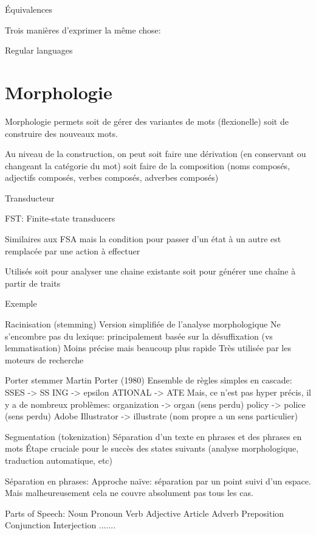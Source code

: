 Équivalences

    Trois manières d'exprimer la même chose:

        Regular languages


\section{Morphologie}

Morphologie permets soit de gérer des variantes de mots (flexionelle) soit de construire des nouveaux mots.

Au niveau de la construction, on peut soit faire une dérivation (en conservant ou changeant la catégorie du mot) soit faire de la composition (noms composés, adjectifs composés, verbes composés, adverbes composés)

Transducteur

    FST: Finite-state transducers

    Similaires aux FSA mais la condition pour passer d'un état à un autre est remplacée par une action à effectuer

    Utilisés soit pour analyser une chaine existante soit pour générer une chaîne à partir de traits

Exemple

Racinisation (stemming)
    Version simplifiée de l'analyse morphologique
    Ne s'encombre pas du lexique: principalement basée sur la désuffixation (vs lemmatisation)
    Moins précise mais beaucoup plus rapide
    Très utilisée par les moteurs de recherche

Porter stemmer
    Martin Porter (1980)
    Ensemble de règles simples en cascade:
        SSES -> SS
        ING -> epsilon
        ATIONAL -> ATE
    Mais, ce n'est pas hyper précis, il y a de nombreux problèmes:
        organization -> organ (sens perdu)
        policy -> police (sens perdu)
        Adobe Illustrator -> illustrate (nom propre a un sens particulier)


Segmentation (tokenization)
    Séparation d'un texte en phrases et des phrases en mots
    Étape cruciale pour le succès des states suivants (analyse morphologique, traduction automatique, etc)

Séparation en phrases:
    Approche naïve: séparation par un point suivi d'un espace. Mais malheureusement cela ne couvre absolument pas tous les cas.

Parts of Speech:
    Noun Pronoun Verb
    Adjective Article Adverb
    Preposition Conjunction Interjection
    .......

